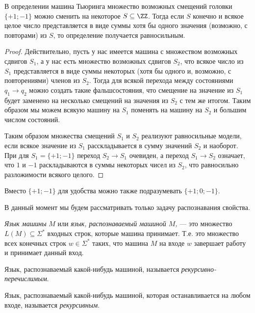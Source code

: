 \documentclass[12pt,a4paper]{article}
\begin{document}
    \begin{theorem}
        В определении машина Тьюринга множество возможных смещений головки $\{+1; -1\}$ можно сменить на некоторое $S \subseteq \ZZ$. Тогда если $S$ конечно и всякое целое число представляется в виде суммы хотя бы одного значения (возможно, с повторами) из $S$, то определение получается равносильным.
    \end{theorem}

    \begin{proof}
        Действительно, пусть у нас имеется машина с множеством возможных сдвигов $S_1$, а у нас есть множество возможных сдвигов $S_2$, что всякое число из $S_1$ представляется в виде суммы некоторых (хотя бы одного и, возможно, с повторениями) членов из $S_2$. Тогда для всякой перехода между состояниями $q_1 \to q_2$ можно создать такие фальшсостояния, что смещение на значение из $S_1$ будет заменено на несколько смещений на значения из $S_2$ с тем же итогом. Таким образом мы можем всякую машину на $S_1$ поменять на машину на $S_2$ и большим числом состояний.
        
        Таким образом множества смещений $S_1$ и $S_2$ реализуют равносильные модели, если всякое значение из $S_1$ расскладывается в сумму значений $S_2$ и наоборот. При для $S_1 = \{+1; -1\}$ переход $S_2 \to S_1$ очевиден, а переход $S_1 \to S_2$ означает, что $1$ и $-1$ раскладываются в суммы некоторых чисел из $S_2$, что равносильно разложимости всякого целого.
    \end{proof}

    \begin{corollary}
        Вместо $\{+1; -1\}$ для удобства можно также подразумевать $\{+1; 0; -1\}$.
    \end{corollary}

    \begin{remark*}
        В данный момент мы будем рассматривать только задачу распознавания свойства.
    \end{remark*}

    \begin{definition}
        \emph{Язык машины} $M$ или \emph{язык, распознаваемый машиной $M$,} --- это множество $L(M) \subseteq \Sigma^*$ входных строк, которые машина принимает. Т.е. это множество всех конечных строк $w \in \Sigma^*$ таких, что машина $M$ на входе $w$ завершает работу и принимает данный вход.

        Язык, распознаваемый какой-нибудь машиной, называется \emph{рекурсивно-перечислимым}.

        Язык, распознаваемый какой-нибудь машиной, которая останавливается на любом входе, называется \emph{рекурсивным}.
    \end{definition}
\end{document}
